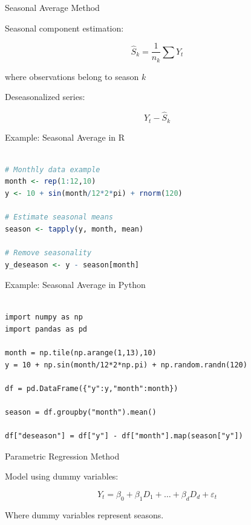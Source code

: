 \documentclass[aspectratio=169]{beamer}
\begin{document}
\begin{frame}{Seasonal Average Method}

Seasonal component estimation:

\[
\hat{S}_k =
\frac{1}{n_k}
\sum Y_t
\]

where observations belong to season $k$

Deseasonalized series:

\[
Y_t - \hat{S}_k
\]

\end{frame}

\begin{frame}[fragile]{Example: Seasonal Average in R}

\begin{lstlisting}[language=R]

# Monthly data example
month <- rep(1:12,10)
y <- 10 + sin(month/12*2*pi) + rnorm(120)

# Estimate seasonal means
season <- tapply(y, month, mean)

# Remove seasonality
y_deseason <- y - season[month]

\end{lstlisting}

\end{frame}

\begin{frame}[fragile]{Example: Seasonal Average in Python}

\begin{lstlisting}

import numpy as np
import pandas as pd

month = np.tile(np.arange(1,13),10)
y = 10 + np.sin(month/12*2*np.pi) + np.random.randn(120)

df = pd.DataFrame({"y":y,"month":month})

season = df.groupby("month").mean()

df["deseason"] = df["y"] - df["month"].map(season["y"])

\end{lstlisting}

\end{frame}

\begin{frame}{Parametric Regression Method}

Model using dummy variables:

\[
Y_t =
\beta_0 +
\beta_1 D_1 +
\dots +
\beta_d D_d +
\varepsilon_t
\]

Where dummy variables represent seasons.

\end{frame}
\end{document}
